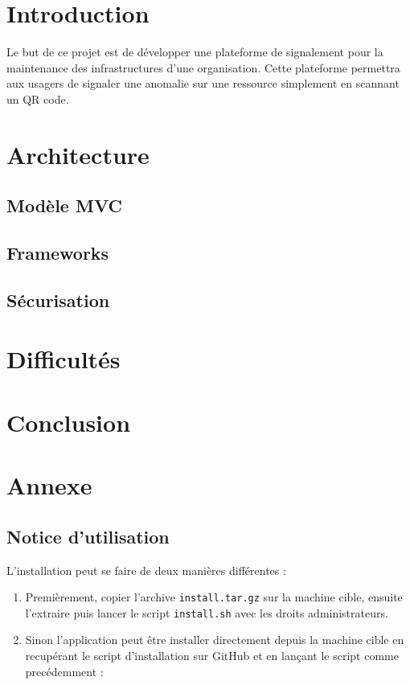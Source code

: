 \chapter{Introduction}

Le but de ce projet est de développer une plateforme de signalement pour la maintenance des
infrastructures d'une organisation. Cette plateforme permettra aux usagers de signaler une
anomalie sur une ressource simplement en scannant un QR code.


\chapter{Architecture}

\section{Modèle MVC}

\section{Frameworks}

\section{Sécurisation}

\chapter{Difficultés}

\chapter{Conclusion}

\chapter{Annexe}

\section{Notice d'utilisation}

L'installation peut se faire de deux manières différentes :

\begin{enumerate}
    \item Premièrement, copier l'archive \verb:install.tar.gz: sur la machine cible, ensuite
        l'extraire puis lancer le script \verb:install.sh: avec les droits administrateurs.

    \item Sinon l'application peut être installer directement depuis la machine cible en recupérant
        le script d'installation sur GitHub et en lançant le script comme precédemment :
\end{enumerate}

